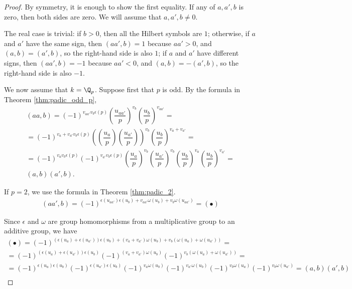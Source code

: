 \begin{proof}
By symmetry, it is enough to show the first equality.
If any of $a, a', b$ is zero, then both sides are zero. We will assume that $a,a',b \neq 0$.

The real case is trivial: if $b > 0$, then all the Hilbert symbols are $1$; otherwise,
if $a$ and $a'$ have the same sign, then $(aa',b) = 1$ because $aa' > 0$, and $(a,b) = (a',b)$, so
the right-hand side is also $1$;
if $a$ and $a'$ have different signs, then $(aa',b) = -1$ because $aa' < 0$, and $(a,b) = -(a',b)$,
so the right-hand side is also $-1$.

We now assume that $k=\Q_p$. Suppose first that $p$ is odd. By the formula in Theorem \ref{thm:padic_odd_p},
\begin{align*}
(aa,b) = (-1)^{v_{aa'}v_b\epsilon(p)}\left(\dfrac{u_{aa'}}{p}\right)^{v_b}\left(\dfrac{u_b}{p}\right)^{v_{aa'}}=\\
=(-1)^{v_a+v_{a'}v_b\epsilon(p)}\left(\left(\dfrac{u_{a}}{p}\right)\left(\dfrac{u_{a'}}{p}\right)\right)^{v_b}\left(\dfrac{u_b}{p}\right)^{v_a+v_{a'}}=\\
=(-1)^{v_av_b\epsilon(p)}(-1)^{v_{a'}v_b\epsilon(p)}\left(\dfrac{u_{a}}{p}\right)^{v_b}\left(\dfrac{u_{a'}}{p}\right)^{v_b}\left(\dfrac{u_b}{p}\right)^{v_a}\left(\dfrac{u_b}{p}\right)^{v_{a'}}=\\
(a,b)(a',b).
\end{align*}

If $p=2$, we use the formula in Theorem \ref{thm:padic_2}.
\begin{align*}
(aa',b) = (-1)^{\epsilon(u_{aa'})\epsilon(u_b) + v_{aa'} \omega(u_b) + v_b \omega(u_{aa'})} = (\bullet)
\end{align*}

Since $\epsilon$ and $\omega$ are group homomorphisms from a multiplicative group to an additive group, we have
\begin{align*}
	(\bullet) = (-1)^{(\epsilon(u_{a})+\epsilon(u_{a'}))\epsilon(u_b) + (v_{a}+v_{a'}) \omega(u_b) + v_b (\omega(u_a)+\omega(u_{a'}))}=\\
	=(-1)^{(\epsilon(u_{a})+\epsilon(u_{a'}))\epsilon(u_b)} (-1)^{(v_{a}+v_{a'}) \omega(u_b)} (-1)^{v_b (\omega(u_a)+\omega(u_{a'}))}=\\
	=(-1)^{\epsilon(u_{a})\epsilon(u_b)}(-1)^{\epsilon(u_{a'})\epsilon(u_b)} (-1)^{v_{a} \omega(u_b)}(-1)^{v_{a'} \omega(u_b)}(-1)^{v_b \omega(u_a)}(-1)^{v_b \omega(u_{a'})}=(a,b)(a',b)\\
\end{align*}

\end{proof}



